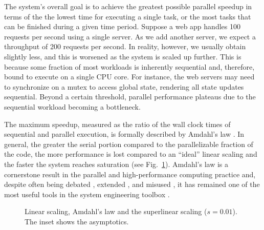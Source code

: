 The system's overall goal is to achieve the greatest possible parallel speedup in terms of the the lowest time for executing a single task, or the most tasks that can be finished during a given time period. Suppose a web app handles 100 requests per second using a single server. As we add another server, we expect a throughput of 200 requests per second. In reality, however, we usually obtain slightly less, and this is worsened as the system is scaled up further. This is because some fraction of most workloads is inherently sequential and, therefore, bound to execute on a single CPU core. For instance, the web servers may need to synchronize on a mutex to access global state, rendering all state updates sequential.  Beyond a certain threshold, parallel performance plateaus due to the sequential workload becoming a bottleneck.

The maximum speedup, measured as the ratio of the wall clock times of sequential and parallel execution, is formally described by Amdahl's law \cite{10.1145/1465482.1465560}. In general, the greater the serial portion compared to the parallelizable fraction of the code, the more performance is lost compared to an ``ideal'' linear scaling and the faster the system reaches saturation (see Fig.~\ref{fig:amdahl}). Amdahl's law is a cornerstone result in the parallel and high-performance computing practice and, despite often being debated \cite{10.1145/42411.42415}, extended \cite{4563876, 6280307,1580395,406581,6163449}, and misused \cite{10.5555/775339.775386}, it has remained one of the most useful tools in the system engineering toolbox \cite{10.5555/1951599}.

\begin{figure}[t]
  \centering
  \begin{small}
  
\end{small}
  \caption{Linear scaling, Amdahl's law and the superlinear scaling ($s=0.01$). The inset shows the asymptotics.}
  \label{fig:amdahl}
\end{figure}

